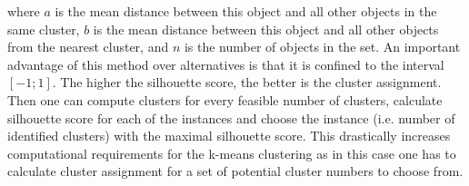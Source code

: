 \documentclass[a4paper,12pt]{article}
\begin{document}
where  $a$ is the mean distance between this object and all other objects in the same cluster, $b$ is the mean distance between this object and all other objects from the nearest cluster, and $n$ is the number of objects in the set. An important advantage of this method over alternatives is that it is confined to the interval $[-1;1]$. The higher the silhouette score, the better is the cluster assignment. Then one can compute clusters for every feasible number of clusters, calculate silhouette score for each of the instances and choose the instance (i.e. number of identified clusters) with the maximal silhouette score. This drastically increases computational requirements for the k-means clustering as in this case one has to calculate cluster assignment for a set of potential cluster numbers to choose from.


\newpage
\section{}\label{appendix:LogitMixedAndFixedEffectResults}
\end{document}
